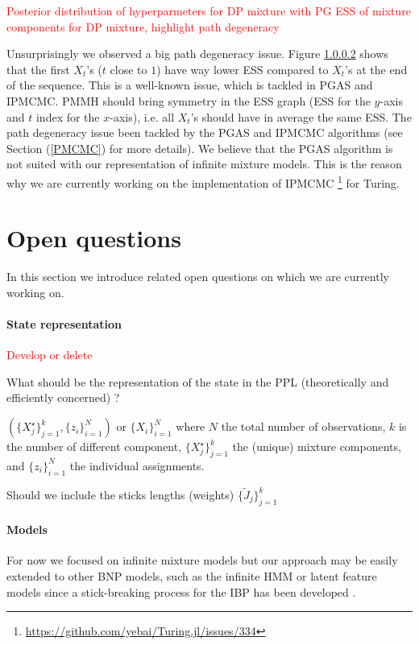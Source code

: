 \textcolor{red}{Posterior distribution of hyperparmeters for DP mixture with PG}
\textcolor{red}{ESS of mixture components for DP mixture, highlight path degeneracy}

Unsurprisingly we observed a big path degeneracy issue. Figure \ref{} shows that the first $X_t$'s ($t$ close to $1$) have way lower \gls{ESS} compared to $X_t$'s at the end of the sequence. This is a well-known issue, which is tackled in \gls{PGAS} and \gls{IPMCMC}.
\gls{PMMH} should bring symmetry in the \gls{ESS} graph (\gls{ESS} for the $y$-axis and $t$ index for the $x$-axis), i.e. all $X_t$'s should have in average the same \gls{ESS}.
The path degeneracy issue been tackled by the \gls{PGAS} and \gls{IPMCMC} algorithms (see Section (\ref{PMCMC}) for more details).
We believe that the \gls{PGAS} algorithm is not suited with our representation of infinite mixture models. This is the reason why we are currently working on the implementation of \gls{IPMCMC} \footnote{\url{https://github.com/yebai/Turing.jl/issues/334}} for Turing.


\section{Open questions}
In this section we introduce related open questions on which we are currently working on.


\paragraph{State representation}
\textcolor{red}{Develop or delete}

What should be the representation of the state in the PPL (theoretically and efficiently concerned) ?

$(\{X_j^\star\}_{j=1}^k, \{z_i\}_{i=1}^N)$ or $\{X_i\}_{i=1}^N$
where $N$ the total number of observations, $k$ is the number of different component, $\{X_j^\star\}_{j=1}^k$ the (unique) mixture components, and $\{z_i\}_{i=1}^N$ the individual assignments.

Should we include the sticks lengths (weights) $\{\tilde{J}_j\}_{j=1}^k$


\paragraph{Models}
For now we focused on infinite mixture models but our approach may be easily extended to other \gls{BNP} models, such as the infinite \acrlong{HMM} \cite{Beal02theinfinite} or latent feature models \cite{Ghahramani:2006tp} since a stick-breaking process for the \acrlong{IBP} has been developed \cite{stick-breaking-ibp}.

